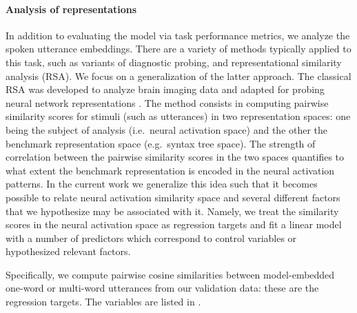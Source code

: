 \paragraph{Analysis of representations}
In addition to evaluating the model via task performance metrics, we
analyze the spoken utterance embeddings. There are a variety of
methods typically applied to this task, such as variants of diagnostic
probing, and representational similarity analysis (RSA). We focus on
a generalization of the latter approach.
The classical RSA was developed to analyze brain imaging data
\citep{kriegeskorte2008representational} and adapted for probing
neural network representations
\citep[e.g.][]{chrupala-alishahi-2019-correlating}. The method
consists in computing pairwise similarity scores for stimuli (such as
utterances) in two representation spaces: one being the subject of
analysis (i.e.\ neural activation space) and the other the benchmark
representation space (e.g.\ syntax tree space). The strength of
correlation between the pairwise similarity scores in the two spaces
quantifies to what extent the benchmark representation is encoded in
the neural activation patterns. In the current work we generalize this
idea such that it becomes possible to relate
neural activation similarity space and several different factors that
we hypothesize may be associated with it. Namely, we treat the
similarity scores in the neural activation space as regression targets
and fit a linear model with a number of predictors which 
correspond to control variables or hypothesized relevant factors.

Specifically, we compute pairwise cosine similarities between
model-embedded one-word or multi-word utterances from our validation data: these are
the regression targets. The variables are listed in .

